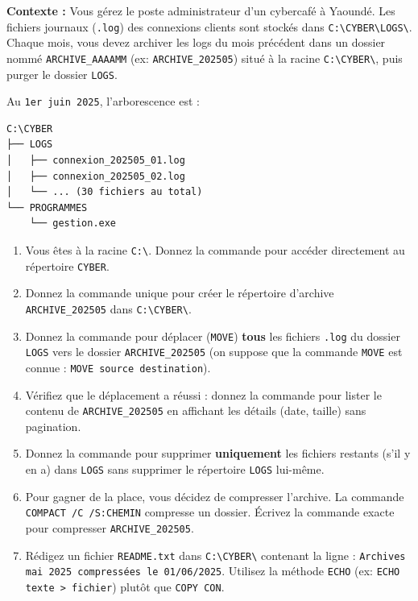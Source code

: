 \documentclass[11pt]{article}
\newcounter{popsec}
\newcounter{popsub}
\newcommand{\courssub}[1]{%
  \stepcounter{popsub}%
  \par\vspace{9pt}\noindent{\popxbold\fontsize{11.5}{13}\selectfont\color{popink}{\color{poporange}\thepopsec.\thepopsub}\hspace{6pt}#1}\par\nopagebreak\vspace{4pt}
}
\begin{document}
\courssub{Je me prépare au Probatoire}

\begin{exercice}
\textbf{Contexte :} Vous gérez le poste administrateur d'un cybercafé à Yaoundé. Les fichiers journaux (\texttt{.log}) des connexions clients sont stockés dans \texttt{C:\textbackslash CYBER\textbackslash LOGS\textbackslash}. Chaque mois, vous devez archiver les logs du mois précédent dans un dossier nommé \texttt{ARCHIVE\_AAAAMM} (ex: \texttt{ARCHIVE\_202505}) situé à la racine \texttt{C:\textbackslash CYBER\textbackslash}, puis purger le dossier \texttt{LOGS}.

Au \texttt{1er juin 2025}, l'arborescence est :
\begin{lstlisting}[language=text]
C:\CYBER
├── LOGS
│   ├── connexion_202505_01.log
│   ├── connexion_202505_02.log
│   └── ... (30 fichiers au total)
└── PROGRAMMES
    └── gestion.exe
\end{lstlisting}

\begin{enumerate}
    \item Vous êtes à la racine \texttt{C:\textbackslash}. Donnez la commande pour accéder directement au répertoire \texttt{CYBER}.
    \item Donnez la commande unique pour créer le répertoire d'archive \texttt{ARCHIVE\_202505} dans \texttt{C:\textbackslash CYBER\textbackslash}.
    \item Donnez la commande pour déplacer (\texttt{MOVE}) \textbf{tous} les fichiers \texttt{.log} du dossier \texttt{LOGS} vers le dossier \texttt{ARCHIVE\_202505} (on suppose que la commande \texttt{MOVE} est connue : \texttt{MOVE source destination}).
    \item Vérifiez que le déplacement a réussi : donnez la commande pour lister le contenu de \texttt{ARCHIVE\_202505} en affichant les détails (date, taille) sans pagination.
    \item Donnez la commande pour supprimer \textbf{uniquement} les fichiers restants (s'il y en a) dans \texttt{LOGS} sans supprimer le répertoire \texttt{LOGS} lui-même.
    \item Pour gagner de la place, vous décidez de compresser l'archive. La commande \texttt{COMPACT /C /S:CHEMIN} compresse un dossier. Écrivez la commande exacte pour compresser \texttt{ARCHIVE\_202505}.
    \item Rédigez un fichier \texttt{README.txt} dans \texttt{C:\textbackslash CYBER\textbackslash} contenant la ligne : \texttt{Archives mai 2025 compressées le 01/06/2025}. Utilisez la méthode \texttt{ECHO} (ex: \texttt{ECHO texte > fichier}) plutôt que \texttt{COPY CON}.
\end{enumerate}
\end{exercice}
\end{document}
